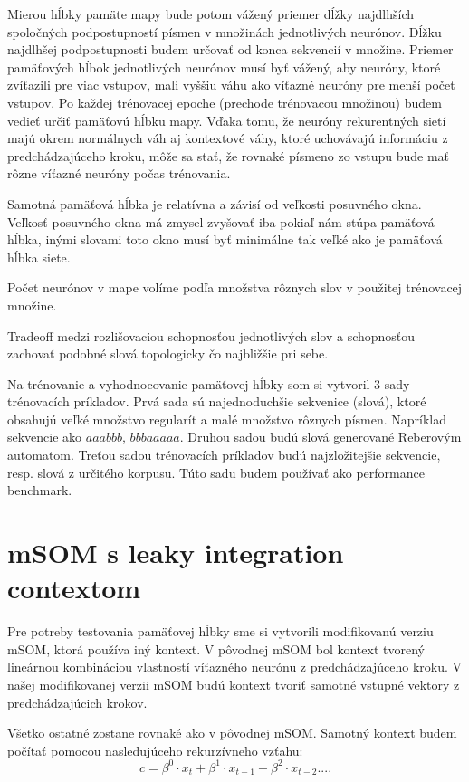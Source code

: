 Mierou hĺbky pamäte mapy bude potom vážený priemer dĺžky najdlhších spoločných podpostupností písmen v množinách jednotlivých neurónov. Dĺžku najdlhšej podpostupnosti budem určovať od konca sekvencií v množine. Priemer pamäťových hĺbok jednotlivých neurónov musí byť vážený, aby neuróny, %
ktoré zvíťazili pre viac vstupov, mali vyššiu váhu ako víťazné neuróny pre menší počet vstupov.
Po každej trénovacej epoche (prechode trénovacou množinou) budem vedieť určiť pamäťovú hĺbku mapy.
Vďaka tomu, že neuróny rekurentných sietí majú okrem normálnych váh aj kontextové váhy, ktoré uchovávajú informáciu z predchádzajúceho kroku,  môže sa stať, že rovnaké písmeno zo vstupu bude mať rôzne víťazné neuróny počas trénovania.

Samotná pamäťová hĺbka je relatívna a závisí od veľkosti posuvného okna.
Veľkosť posuvného okna má zmysel zvyšovať iba pokiaľ nám stúpa pamäťová hĺbka, inými
slovami toto okno musí byť minimálne tak veľké ako je pamäťová hĺbka siete.

Počet neurónov v mape volíme podľa množstva rôznych slov v použitej trénovacej
množine.

Tradeoff medzi rozlišovaciou schopnosťou jednotlivých slov a schopnosťou
zachovať podobné slová topologicky čo najbližšie pri sebe.

Na trénovanie a vyhodnocovanie pamäťovej hĺbky som si vytvoril 3 sady 
trénovacích príkladov. 
Prvá sada sú najednoduchšie sekvenice (slová), ktoré obsahujú veľké množstvo regularít a malé množstvo rôznych písmen.
Napríklad sekvencie ako $aaabbb$,  $bbbaaaaa$.
Druhou sadou budú slová generované Reberovým automatom.
Treťou sadou trénovacích príkladov budú najzložitejšie sekvencie, resp. slová z určitého korpusu. 
Túto sadu budem používať ako performance benchmark. 

\section{mSOM s leaky integration contextom}
Pre potreby testovania pamäťovej hĺbky sme si vytvorili modifikovanú verziu mSOM, ktorá používa iný kontext.
V pôvodnej mSOM bol kontext tvorený lineárnou kombináciou vlastností víťazného neurónu z predchádzajúceho kroku.
V našej modifikovanej verzii mSOM budú kontext tvoriť samotné vstupné vektory z predchádzajúcich krokov.

Všetko ostatné zostane rovnaké ako v pôvodnej mSOM.
Samotný kontext budem počítať pomocou nasledujúceho rekurzívneho vzťahu:
\begin{equation}
	c = \beta^{0} \cdot x_{t} + \beta^{1} \cdot x_{t-1} + 
	\beta^{2} \cdot x_{t-2}....
\end{equation}

